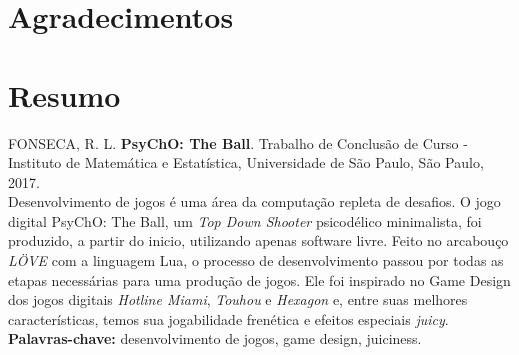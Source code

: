 \chapter*{Agradecimentos}



\chapter*{Resumo}

\noindent%
FONSECA, R. L. \textbf{PsyChO: The Ball}. Trabalho de Conclusão de Curso
 - Instituto de Matemática e Estatística, Universidade de São Paulo,
São Paulo, 2017.
\\

Desenvolvimento de jogos é uma área da computação repleta de desafios. O jogo digital PsyChO: The Ball, um \textit{Top Down Shooter} psicodélico minimalista, foi produzido, a partir do inicio, utilizando apenas software livre. Feito no arcabouço \textit{LÖVE} com a linguagem Lua, o processo de desenvolvimento passou por todas as etapas necessárias para uma produção de jogos. Ele foi inspirado no Game Design dos jogos digitais \textit{Hotline Miami}, \textit{Touhou} e \textit{Hexagon} e, entre suas melhores características, temos sua jogabilidade frenética e efeitos especiais \textit{juicy}.
\\

\noindent%
\textbf{Palavras-chave:} desenvolvimento de jogos, game design, juiciness.

